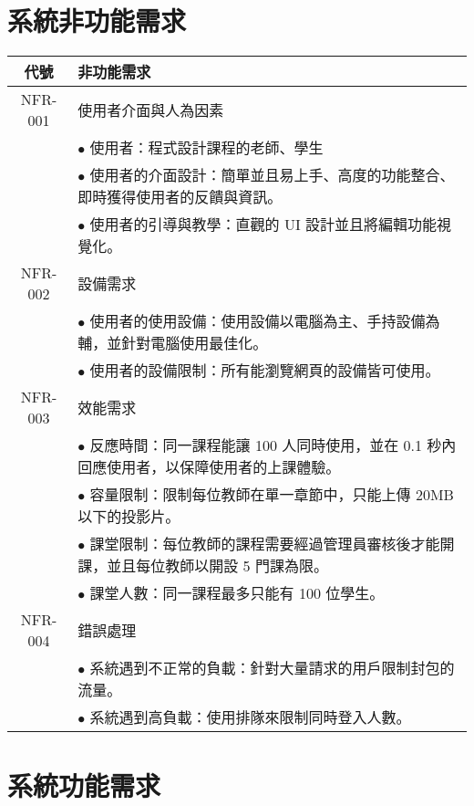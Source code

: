 \documentclass[12pt]{article}
\begin{document}
\section{系統非功能需求}
\begin{table}[H]
  \centering
  \begin{tabular}{|c|p{10cm}|}
    \hline
    \textbf{代號} & \textbf{非功能需求} \\
    \hline
    NFR-001 & 使用者介面與人為因素 \\ 
    & $\bullet$ 使用者：程式設計課程的老師、學生 \\
    & $\bullet$ 使用者的介面設計：簡單並且易上手、高度的功能整合、即時獲得使用者的反饋與資訊。 \\
    & $\bullet$ 使用者的引導與教學：直觀的 UI 設計並且將編輯功能視覺化。\\
    \hline
    NFR-002 & 設備需求 \\
    & $\bullet$ 使用者的使用設備：使用設備以電腦為主、手持設備為輔，並針對電腦使用最佳化。\\
    & $\bullet$ 使用者的設備限制：所有能瀏覽網頁的設備皆可使用。\\
    \hline
    NFR-003 & 效能需求 \\
    & $\bullet$ 反應時間：同一課程能讓 100 人同時使用，並在 0.1 秒內回應使用者，以保障使用者的上課體驗。\\
    & $\bullet$ 容量限制：限制每位教師在單一章節中，只能上傳 20MB 以下的投影片。\\
    & $\bullet$ 課堂限制：每位教師的課程需要經過管理員審核後才能開課，並且每位教師以開設 5 門課為限。\\
    & $\bullet$ 課堂人數：同一課程最多只能有 100 位學生。\\
    \hline
    NFR-004 & 錯誤處理 \\
    & $\bullet$ 系統遇到不正常的負載：針對大量請求的用戶限制封包的流量。\\
    & $\bullet$ 系統遇到高負載：使用排隊來限制同時登入人數。\\
    \hline
  \end{tabular}
\end{table}

\section{系統功能需求}
\end{document}
